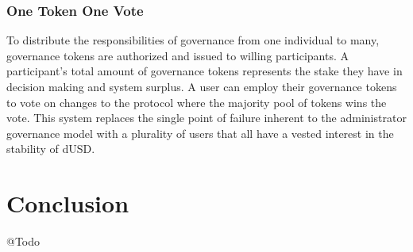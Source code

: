 \documentclass[12pt]{article}
\begin{document}
\subsubsection{One Token One Vote}
To distribute the responsibilities of governance from one individual to many, governance tokens are authorized and issued to willing participants. A participant's total amount of governance tokens represents the stake they have in decision making and system surplus. A user can employ their governance tokens to vote on changes to the protocol where the majority pool of tokens wins the vote. This system replaces the single point of failure inherent to the administrator governance model with a plurality of users that all have a vested interest in the stability of dUSD.

\section{Conclusion}
\begin{flushleft}
	\color{red} @Todo
\end{flushleft}
\end{document}
